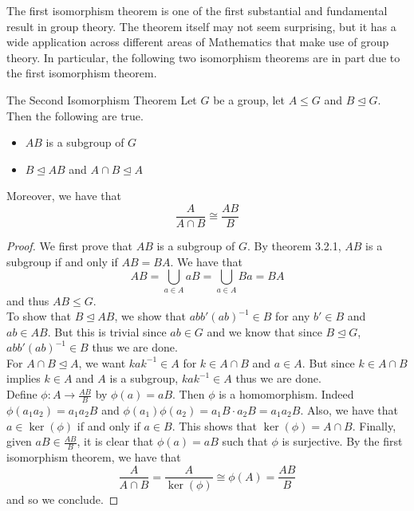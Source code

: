 \documentclass[a4paper]{article}
\begin{document}
The first isomorphism theorem is one of the first substantial and fundamental result in group theory. The theorem itself may not seem surprising, but it has a wide application across different areas of Mathematics that make use of group theory. In particular, the following two isomorphism theorems are in part due to the first isomorphism theorem. 

\begin{thm}{The Second Isomorphism Theorem}{} Let $G$ be a group, let $A\leq G$ and $B\trianglelefteq G$. Then the following are true. 
\begin{itemize}
\item $AB$ is a subgroup of $G$
\item $B\trianglelefteq AB$ and $A\cap B\trianglelefteq A$
\end{itemize} 
Moreover, we have that $$\frac{A}{A\cap B}\cong\frac{AB}{B}$$ 
\begin{proof}
We first prove that $AB$ is a subgroup of $G$. By theorem 3.2.1, $AB$ is a subgroup if and only if $AB=BA$. We have that $$AB=\bigcup_{a\in A}aB=\bigcup_{a\in A}Ba=BA$$ and thus $AB\leq G$. \\
To show that $B\trianglelefteq AB$, we show that $abb'(ab)^{-1}\in B$ for any $b'\in B$ and $ab\in AB$. But this is trivial since $ab\in G$ and we know that since $B\trianglelefteq G$, $abb'(ab)^{-1}\in B$ thus we are done. \\
For $A\cap B\trianglelefteq A$, we want $kak^{-1}\in A$ for $k\in A\cap B$ and $a\in A$. But since $k\in A\cap B$ implies $k\in A$ and $A$ is a subgroup, $kak^{-1}\in A$ thus we are done. \\

Define $\phi:A\to\frac{AB}{B}$ by $\phi(a)=aB$. Then $\phi$ is a homomorphism. Indeed $\phi(a_1a_2)=a_1a_2B$ and $\phi(a_1)\phi(a_2)=a_1B\cdot a_2B=a_1a_2B$. Also, we have that $a\in\ker(\phi)$ if and only if $a\in B$. This shows that $\ker(\phi)=A\cap B$. Finally, given $aB\in\frac{AB}{B}$, it is clear that $\phi(a)=aB$ such that $\phi$ is surjective. By the first isomorphism theorem, we have that $$\frac{A}{A\cap B}=\frac{A}{\ker(\phi)}\cong\phi(A)=\frac{AB}{B}$$ and so we conclude. 
\end{proof}
\end{thm}
\end{document}
